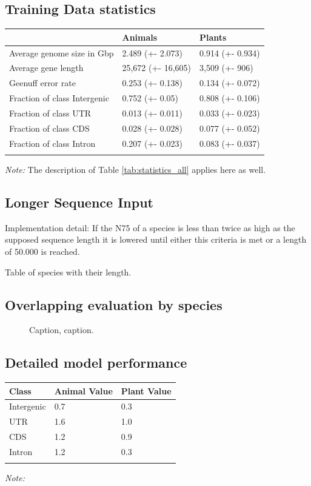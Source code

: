 \documentclass{bioinfo}
\begin{document}
\subsection{Training Data statistics}
\label{sec:training_data}
\begin{table}[!t]
 {
\begin{tabular}{@{}lll@{}}
\toprule & Animals & Plants\\
\midrule
Average genome size in Gbp& 2.489 (+- 2.073) & 0.914 (+- 0.934) \\
Average gene length & 25,672 (+- 16,605) & 3,509 (+- 906)\\
Geenuff error rate & 0.253 (+- 0.138) & 0.134 (+- 0.072) \\
Fraction of class Intergenic & 0.752 (+- 0.05) & 0.808 (+- 0.106) \\
Fraction of class UTR & 0.013 (+- 0.011) & 0.033 (+- 0.023) \\
Fraction of class CDS & 0.028 (+- 0.028) & 0.077 (+- 0.052) \\
Fraction of class Intron  & 0.207 (+- 0.023) & 0.083 (+- 0.037) \\
\botrule
\end{tabular}}{{\it Note:} The description of Table \ref{tab:statistics_all} applies here as well.}
\end{table}

\subsection{Longer Sequence Input}
\label{sec:longer}
Implementation detail:
If the N75 of a species is less than twice as high as the supposed sequence length it is lowered until either this criteria is met or a length of 50.000 is reached. 

Table of species with their length.

\subsection{Overlapping evaluation by species}
\label{sec:overlapping}
\begin{figure}[!tpb]
\caption{Caption, caption.}\label{fig:animals_overlapping}
\end{figure}


\subsection{Detailed model performance}

\begin{table}[!t]
 {
\begin{tabular}{@{}lll@{}}
\toprule Class & Animal Value & Plant Value \\
\midrule
Intergenic & 0.7 & 0.3 \\
UTR & 1.6 & 1.0 \\
CDS & 1.2 & 0.9 \\
Intron & 1.2 & 0.3 \\
\botrule
\end{tabular}}{{\it Note:} }
\end{table}
\end{document}
